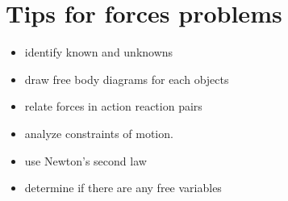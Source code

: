 \documentclass{article}
\theoremstyle{mytheoremstyle}
\theoremstyle{mytheoremstyle}
\theoremstyle{myproblemstyle}
\begin{document}
    \section*{Tips for forces problems}
    \begin{itemize}
        \item identify known and unknowns
        \item draw free body diagrams for each objects
        \item relate forces in action reaction pairs
        \item analyze constraints of motion.
        \item use Newton's second law
        \item determine if there are any free variables
    \end{itemize}
\end{document}
